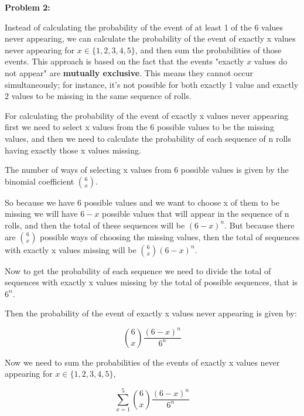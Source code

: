 \textbf{Problem 2:}

\singlespacing

Instead of calculating the probability of the event of at least 1 of the 6 values never appearing,
we can calculate the probability of the event of exactly x values never appearing for $x \in \{1, 2, 3, 4, 5\}$,
and then sum the probabilities of those events. This approach is based on the fact that the events
"exactly $x$ values do not appear" are \textbf{mutually exclusive}. This means
they cannot occur simultaneously; for instance, it's not possible for both
exactly 1 value and exactly 2 values to be missing in the same sequence of
rolls.

\singlespacing

For calculating the probability of the event of exactly x values never appearing
first we need to select x values from the 6 possible values to be the missing values,
and then we need to calculate the probability of each sequence of n rolls having exactly
those x values missing.

\singlespacing

The number of ways of selecting x values from 6 possible values is given by the binomial coefficient $\binom{6}{x}$.

\singlespacing

So because we have 6 possible values and we want to choose x of them to be missing we will
have $6 - x$ possible values that will appear in the sequence of n rolls,
and then the total of these sequences will be $(6 - x)^n$. But because there are $\binom{6}{x}$
possible ways of choosing the missing values, then the total of sequences with exactly x values
missing will be $\binom{6}{x} (6 - x)^n$.

\singlespacing

Now to get the probability of each sequence we need to divide the total of sequences with exactly x values
missing by the total of possible sequences, that is $6^n$.

\singlespacing

Then the probability of the event of exactly x values never appearing is given by:

\singlespacing

\begin{equation}
    \binom{6}{x} \frac{(6 - x)^n}{6^n}
\end{equation}

\singlespacing

Now we need to sum the probabilities of the events of exactly x values never appearing for $x \in \{1, 2, 3, 4, 5\}$,

\singlespacing

\begin{equation}
    \sum_{x=1}^{5} \binom{6}{x} \frac{(6 - x)^n}{6^n}
\end{equation}